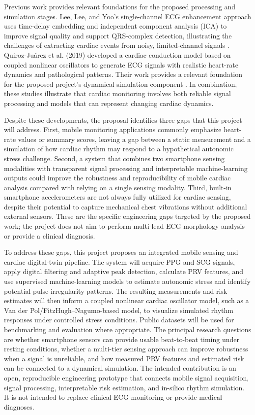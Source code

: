 Previous work provides relevant foundations for the proposed processing and simulation stages. Lee, Lee, and Yoo's single-channel ECG enhancement approach uses time-delay embedding and independent component analysis (ICA) to improve signal quality and support QRS-complex detection, illustrating the challenges of extracting cardiac events from noisy, limited-channel signals \cite{paper_1}. Quiroz-Juárez et al. (2019) developed a cardiac conduction model based on coupled nonlinear oscillators to generate ECG signals with realistic heart-rate dynamics and pathological patterns. Their work provides a relevant foundation for the proposed project's dynamical simulation component \cite{paper_2}. In combination, these studies illustrate that cardiac monitoring involves both reliable signal processing and models that can represent changing cardiac dynamics.

Despite these developments, the proposal identifies three gaps that this project will address. First, mobile monitoring applications commonly emphasize heart-rate values or summary scores, leaving a gap between a static measurement and a simulation of how cardiac rhythm may respond to a hypothetical autonomic stress challenge. Second, a system that combines two smartphone sensing modalities with transparent signal processing and interpretable machine-learning outputs could improve the robustness and reproducibility of mobile cardiac analysis compared with relying on a single sensing modality. Third, built-in smartphone accelerometers are not always fully utilized for cardiac sensing, despite their potential to capture mechanical chest vibrations without additional external sensors. These are the specific engineering gaps targeted by the proposed work; the project does not aim to perform multi-lead ECG morphology analysis or provide a clinical diagnosis.

To address these gaps, this project proposes an integrated mobile sensing and cardiac digital-twin pipeline. The system will acquire PPG and SCG signals, apply digital filtering and adaptive peak detection, calculate PRV features, and use supervised machine-learning models to estimate autonomic stress and identify potential pulse-irregularity patterns. The resulting measurements and risk estimates will then inform a coupled nonlinear cardiac oscillator model, such as a Van der Pol/FitzHugh--Nagumo-based model, to visualize simulated rhythm responses under controlled stress conditions. Public datasets will be used for benchmarking and evaluation where appropriate. The principal research questions are whether smartphone sensors can provide usable beat-to-beat timing under resting conditions, whether a multi-tier sensing approach can improve robustness when a signal is unreliable, and how measured PRV features and estimated risk can be connected to a dynamical simulation. The intended contribution is an open, reproducible engineering prototype that connects mobile signal acquisition, signal processing, interpretable risk estimation, and in-silico rhythm simulation. It is not intended to replace clinical ECG monitoring or provide medical diagnoses.

